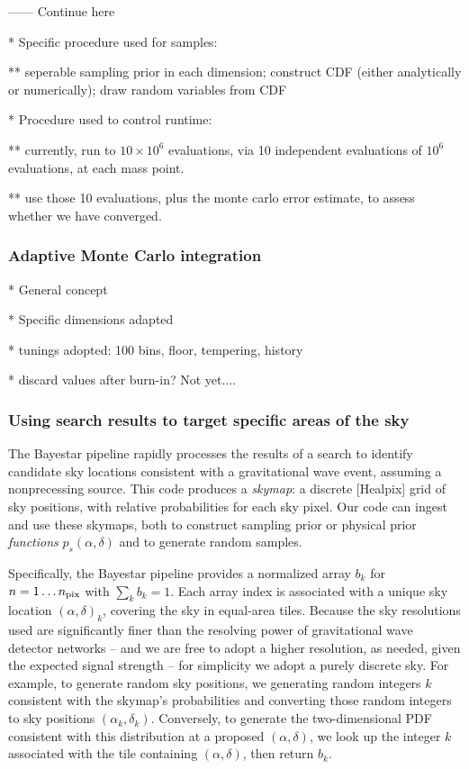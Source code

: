 \documentclass[twocolumn,prd,nofootinbib]{revtex4}
\newcommand\editremark[1]{{\color{red} #1}}
\newcommand\BS{{\sc Bayestar}}
\begin{document}
------ \editremark{Continue here}

* Specific procedure used for samples:

** seperable sampling prior in each dimension; construct CDF (either analytically or
numerically); draw random variables from CDF


* Procedure used to control runtime:

** currently, run to $10\times10^6$ evaluations, via 10 independent evaluations of $10^6$ evaluations, at each mass
point.

** use those 10 evaluations, plus the monte carlo error estimate, to assess whether we have converged.


\subsubsection{Adaptive Monte Carlo integration}

* General concept

* Specific dimensions adapted

* tunings adopted: 100 bins, floor, tempering, history

* discard values after burn-in? Not yet....

\subsubsection{Using search results to target specific areas of the sky}

The \BS{} pipeline \cite{gw-astro-Bayestar} rapidly processes the results of a search to identify candidate sky
locations consistent with a gravitational wave event, assuming a nonprecessing source.   
%
This code produces a \emph{skymap}: a discrete [Healpix] grid of sky positions, with relative probabilities for each sky
pixel.  
%
Our code can ingest and use these skymaps,  both to construct sampling prior or physical prior \emph{functions}
$p_s(\alpha,\delta)$ and to generate random samples. 

Specifically, the \BS{} pipeline provides a normalized array  $b_k$  for $n=1\ldots n_{\rm pix}$ with $\sum_k b_k=1$.    
Each array index is associated with a unique sky location $(\alpha,\delta)_k $, covering the sky in equal-area tiles.  
%
Because the sky resolutions used are  significantly finer than the resolving power of gravitational wave detector
networks -- and we are free to adopt a higher resolution, as needed, given the expected signal strength -- 
 for simplicity we adopt a purely discrete sky.  For example, to generate  random sky positions, we generating random integers $k$ consistent with
the skymap's probabilities and converting those random integers to sky positions $(\alpha_k,\delta_k)$.  Conversely, to
generate the two-dimensional PDF consistent with this distribution at a proposed $(\alpha,\delta)$, we look up the
integer $k$ associated with the tile containing $(\alpha,\delta)$, then return $b_k$.  
\end{document}
